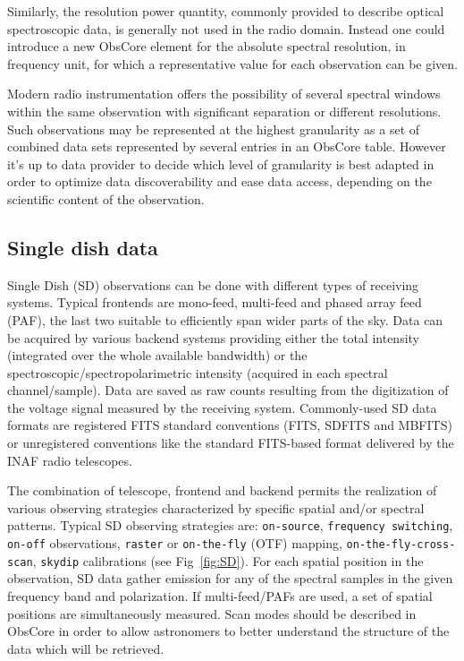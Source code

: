 \documentclass[11pt,a4paper]{ivoa}
\begin{document}
Similarly, the resolution power quantity, commonly provided to describe optical spectroscopic data, is generally not used in the radio domain.
Instead one could introduce a new ObsCore element for the absolute spectral resolution, in frequency unit, for which a representative value for each observation can be given.

Modern radio instrumentation offers the possibility of several  spectral windows within the same observation with significant separation or different resolutions.
Such observations may be represented at the highest granularity as  a set of combined data sets represented by several entries in an ObsCore table. However it's up to data provider to decide which level of granularity is best adapted in order to optimize data discoverability and ease data access, depending on the scientific content of the observation.



\subsection{Single dish data}\label{subsec:sd}

Single Dish (SD) observations can be done with different types of receiving systems. Typical frontends are mono-feed, multi-feed and phased array feed (PAF), the last two suitable to efficiently span wider parts of the sky.
Data can be acquired by various backend systems providing either the total intensity (integrated over the whole available bandwidth) or the spectroscopic/spectropolarimetric intensity (acquired in each spectral channel/sample).
Data are saved as raw counts resulting from the digitization of the voltage signal measured by the receiving system.
Commonly-used SD data formats are registered FITS standard conventions (FITS, SDFITS and MBFITS) or unregistered conventions like the standard FITS-based format delivered by the INAF radio telescopes.

The combination of telescope, frontend and backend permits the realization of various observing strategies characterized by specific spatial and/or spectral patterns.
Typical SD observing strategies are: \texttt{on-source}, \texttt{frequency switching}, \texttt{on-off} observations, \texttt{raster} or \texttt{on-the-fly} (OTF) mapping, \texttt{on-the-fly-cross-scan}, \texttt{skydip} calibrations (see Fig~\ref{fig:SD}). For each spatial position in the observation, SD data gather emission for any of the spectral samples in the given frequency band and polarization.
If multi-feed/PAFs are used, a set of spatial positions are simultaneously measured. Scan modes should be described in ObsCore in order to allow astronomers to better understand the structure of the data which will be retrieved.
\end{document}
